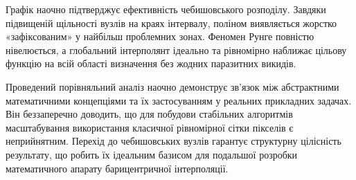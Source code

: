 Графік наочно підтверджує ефективність чебишовського розподілу. Завдяки підвищеній щільності вузлів на краях інтервалу, поліном виявляється жорстко «зафіксованим» у найбільш проблемних зонах. Феномен Рунге повністю нівелюється, а глобальний інтерполянт ідеально та рівномірно наближає цільову функцію на всій області визначення без жодних паразитних викидів. 

Проведений порівняльний аналіз наочно демонструє зв'язок між абстрактними математичними концепціями та їх застосуванням у реальних прикладних задачах. Він беззаперечно доводить, що для побудови стабільних алгоритмів масштабування використання класичної рівномірної сітки пікселів є неприйнятним. Перехід до чебишовських вузлів гарантує структурну цілісність результату, що робить їх ідеальним базисом для подальшої розробки математичного апарату барицентричної інтерполяції.